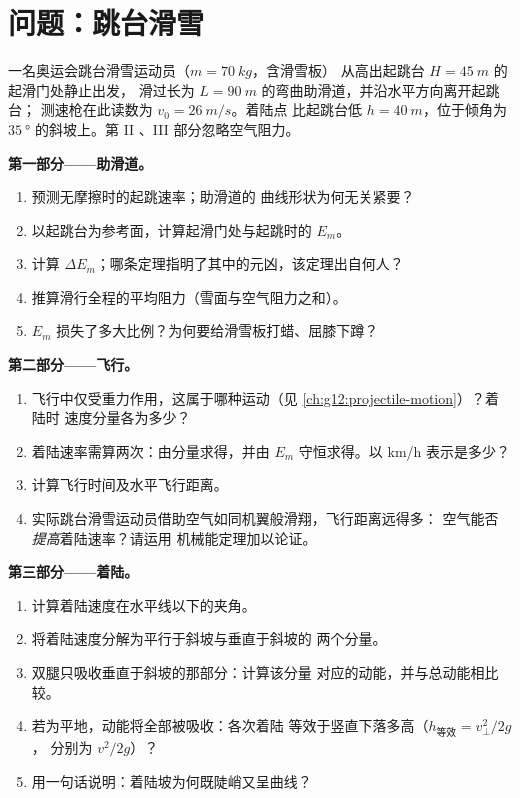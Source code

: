 \section{问题：跳台滑雪}

\begin{problem}
\label{pb:g12:work-and-energy:1}
一名奥运会跳台滑雪运动员（$m = \qty{70}{kg}$，含滑雪板）
从高出起跳台 $H = \qty{45}{m}$ 的起滑门处静止出发，
滑过长为 $L = \qty{90}{m}$ 的弯曲助滑道，并沿水平方向离开起跳台；
测速枪在此读数为 $v_0 = \qty{26}{m/s}$。着陆点
比起跳台低 $h = \qty{40}{m}$，位于倾角为 $\qty{35}{\degree}$ 的斜坡上。第 II
、III 部分忽略空气阻力。

\medskip\noindent\textbf{第一部分——助滑道。}
\begin{enumerate}
  \item 预测无摩擦时的起跳速率；助滑道的
        曲线形状为何无关紧要？
  \item 以起跳台为参考面，计算起滑门处与起跳时的 $E_m$。
  \item 计算 $\Delta E_m$；哪条定理指明了其中的元凶，该定理出自何人？
  \item 推算滑行全程的平均阻力（雪面与空气阻力之和）。
  \item $E_m$ 损失了多大比例？为何要给滑雪板打蜡、屈膝下蹲？
\end{enumerate}

\medskip\noindent\textbf{第二部分——飞行。}
\begin{enumerate}[resume]
  \item 飞行中仅受重力作用，这属于哪种运动（见
        \cref{ch:g12:projectile-motion}）？着陆时
        速度分量各为多少？
  \item 着陆速率需算两次：由分量求得，并由 $E_m$
        守恒求得。以 \unit{km/h} 表示是多少？
  \item 计算飞行时间及水平飞行距离。
  \item 实际跳台滑雪运动员借助空气如同机翼般滑翔，飞行距离远得多：
        空气能否\emph{提高}着陆速率？请运用
        机械能定理加以论证。
\end{enumerate}

\medskip\noindent\textbf{第三部分——着陆。}
\begin{enumerate}[resume]
  \item 计算着陆速度在水平线以下的夹角。
  \item 将着陆速度分解为平行于斜坡与垂直于斜坡的
        两个分量。
  \item 双腿只吸收垂直于斜坡的那部分：计算该分量
        对应的动能，并与总动能相比较。
  \item 若为平地，动能将全部被吸收：各次着陆
        等效于竖直下落多高（$h_{\text{等效}} = v_\perp^2/2g$，
        分别为 $v^2/2g$）？
  \item 用一句话说明：着陆坡为何既陡峭又呈曲线？
\end{enumerate}


\end{problem}
